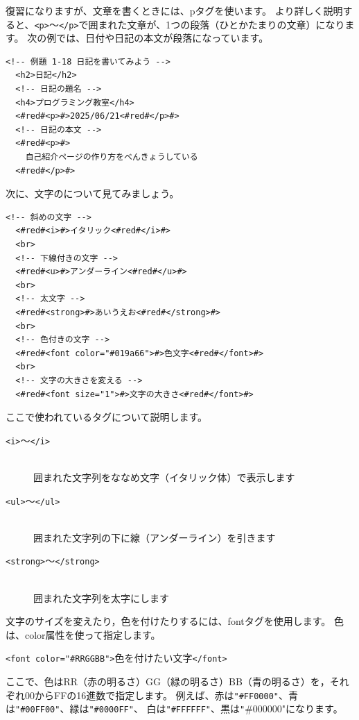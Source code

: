 \documentclass[text01.tex]{subfiles}
\begin{document}
復習になりますが、文章を書くときには、pタグを使います。
より詳しく説明すると、\texttt{<p>}～\texttt{</p>}で囲まれた文章が、1つの段落（ひとかたまりの文章）になります。
次の例では、日付や日記の本文が段落になっています。
\bigskip

\noindent%
\begin{lstlisting}[caption=段落の例,label=pwdtest,firstnumber=1]
  <!-- 例題 1-18 日記を書いてみよう -->
  <h2>日記</h2>
  <!-- 日記の題名 -->
  <h4>プログラミング教室</h4>
  <#red#<p>#>2025/06/21<#red#</p>#>
  <!-- 日記の本文 -->
  <#red#<p>#>
    自己紹介ページの作り方をべんきょうしている
  <#red#</p>#>
\end{lstlisting}

次に、文字のについて見てみましょう。
\bigskip

\noindent%
\begin{lstlisting}[caption=文字の\ruby{装飾}{そうしょく},label=pwdtest,firstnumber=1]
  <!-- 斜めの文字 -->
  <#red#<i>#>イタリック<#red#</i>#>
  <br>
  <!-- 下線付きの文字 -->
  <#red#<u>#>アンダーライン<#red#</u>#>
  <br>
  <!-- 太文字 -->
  <#red#<strong>#>あいうえお<#red#</strong>#>
  <br>
  <!-- 色付きの文字 -->
  <#red#<font color="#019a66">#>色文字<#red#</font>#>	
  <br>
  <!-- 文字の大きさを変える -->
  <#red#<font size="1">#>文字の大きさ<#red#</font>#>
\end{lstlisting}


ここで使われているタグについて説明します。

\begin{description}
  \item[\texttt{<i>}～\texttt{</i>}]\mbox{}\\
  囲まれた文字列をななめ文字（イタリック体）で表示します
  \item[\texttt{<ul>}～\texttt{</ul>}] \mbox{}\\
  囲まれた文字列の下に線（アンダーライン）を引きます
  \item[\texttt{<strong>}～\texttt{</strong>}] \mbox{}\\
  囲まれた文字列を太字にします
\end{description}

\noindent%
文字のサイズを変えたり，色を付けたりするには、fontタグを使用します。
色は、color属性を使って指定します。
\bigskip

\texttt{<font color="\#RRGGBB">}色を付けたい文字\texttt{</font>}\\
\bigskip

\noindent%
ここで、色はRR（赤の明るさ）GG（緑の明るさ）BB（青の明るさ）を，それぞれ00からFFの16進数で指定します。
例えば、赤は\texttt{"\#FF0000"}、青は\texttt{"\#00FF00"}、緑は\texttt{"\#0000FF"}、
白は\texttt{"\#FFFFFF"}、黒は\texttt"{\#000000"}になります。
\end{document}
